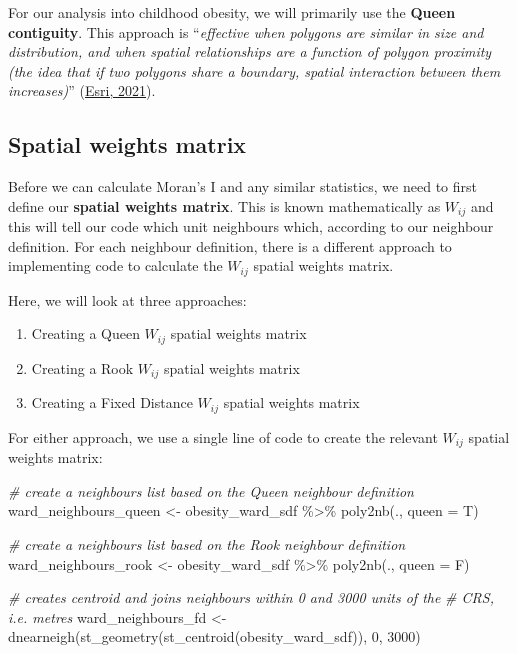\documentclass[
]{book}
\newenvironment{Shaded}{\begin{snugshade}}{\end{snugshade}}
\newcommand{\AttributeTok}[1]{\textcolor[rgb]{0.77,0.63,0.00}{#1}}
\newcommand{\CommentTok}[1]{\textcolor[rgb]{0.56,0.35,0.01}{\textit{#1}}}
\newcommand{\DecValTok}[1]{\textcolor[rgb]{0.00,0.00,0.81}{#1}}
\newcommand{\FunctionTok}[1]{\textcolor[rgb]{0.00,0.00,0.00}{#1}}
\newcommand{\NormalTok}[1]{#1}
\newcommand{\OtherTok}[1]{\textcolor[rgb]{0.56,0.35,0.01}{#1}}
\newcommand{\SpecialCharTok}[1]{\textcolor[rgb]{0.00,0.00,0.00}{#1}}
\providecommand{\tightlist}{%
  \setlength{\itemsep}{0pt}\setlength{\parskip}{0pt}}
\begin{document}
For our analysis into childhood obesity, we will primarily use the \textbf{Queen contiguity}. This approach is ``\emph{effective when polygons are similar in size and distribution, and when spatial relationships are a function of polygon proximity (the idea that if two polygons share a boundary, spatial interaction between them increases)}'' (\href{https://pro.arcgis.com/en/pro-app/latest/tool-reference/spatial-statistics/modeling-spatial-relationships.htm\#GUID-729B3B01-6911-41E9-AA99-8A4CF74EEE27}{Esri, 2021}).

\hypertarget{spatial-weights-matrix}{%
\subsection{Spatial weights matrix}\label{spatial-weights-matrix}}

Before we can calculate Moran's I and any similar statistics, we need to first define our \textbf{spatial weights matrix}. This is known mathematically as \(W_{ij}\) and this will tell our code which unit neighbours which, according to our neighbour definition. For each neighbour definition, there is a different approach to implementing code to calculate the \(W_{ij}\) spatial weights matrix.

Here, we will look at three approaches:

\begin{enumerate}
\def\labelenumi{\arabic{enumi}.}
\tightlist
\item
  Creating a Queen \(W_{ij}\) spatial weights matrix
\item
  Creating a Rook \(W_{ij}\) spatial weights matrix
\item
  Creating a Fixed Distance \(W_{ij}\) spatial weights matrix
\end{enumerate}

For either approach, we use a single line of code to create the relevant \(W_{ij}\) spatial weights matrix:

\begin{Shaded}
\begin{Highlighting}[]
\CommentTok{\# create a neighbours list based on the Queen neighbour definition}
\NormalTok{ward\_neighbours\_queen }\OtherTok{\textless{}{-}}\NormalTok{ obesity\_ward\_sdf }\SpecialCharTok{\%\textgreater{}\%}
    \FunctionTok{poly2nb}\NormalTok{(., }\AttributeTok{queen =}\NormalTok{ T)}

\CommentTok{\# create a neighbours list based on the Rook neighbour definition}
\NormalTok{ward\_neighbours\_rook }\OtherTok{\textless{}{-}}\NormalTok{ obesity\_ward\_sdf }\SpecialCharTok{\%\textgreater{}\%}
    \FunctionTok{poly2nb}\NormalTok{(., }\AttributeTok{queen =}\NormalTok{ F)}

\CommentTok{\# creates centroid and joins neighbours within 0 and 3000 \textquotesingle{}units\textquotesingle{} of the}
\CommentTok{\# CRS, i.e. metres}
\NormalTok{ward\_neighbours\_fd }\OtherTok{\textless{}{-}} \FunctionTok{dnearneigh}\NormalTok{(}\FunctionTok{st\_geometry}\NormalTok{(}\FunctionTok{st\_centroid}\NormalTok{(obesity\_ward\_sdf)),}
    \DecValTok{0}\NormalTok{, }\DecValTok{3000}\NormalTok{)}
\end{Highlighting}
\end{Shaded}
\end{document}
